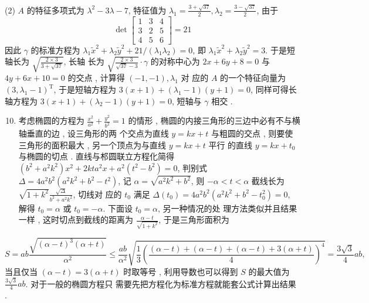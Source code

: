 \documentclass[10pt]{article}
\begin{document}
(2) $A$  的特征多项式为  $\lambda^{2}-3 \lambda-7$,  特征值为  $\lambda_{1}=\frac{3+\sqrt{37}}{2}, \lambda_{2}=\frac{3-\sqrt{37}}{2}$,  由于 
$$
\operatorname{det}\left[\begin{array}{ccc}
1 & 3 & 4 \\
3 & 2 & 5 \\
4 & 5 & 6
\end{array}\right]=21
$$
 因此  $\gamma$  的标准方程为  $\lambda_{1} \tilde{x}^{2}+\lambda_{2} \tilde{y}^{2}+21 /\left(\lambda_{1} \lambda_{2}\right)=0$,  即  $\lambda_{1} \tilde{x}^{2}+\lambda_{2} \tilde{y}^{2}=3$.  于是短轴长为  $\sqrt{\frac{2 \times 3}{3+\sqrt{37}}}$,  长轴   长为  $\sqrt{\frac{2 \times 3}{\sqrt{37}-3}} \cdot \gamma$  的对称中心为  $2 x+6 y+8=0$  与  $4 y+6 x+10=0$  的交点 ,  计算得  $(-1,-1), \lambda_{1}$  对   应的  $A$  的一个特征向量为  $\left(3, \lambda_{1}-1\right)^{\mathrm{T}}$,  于是短轴方程为  $3(x+1)+\left(\lambda_{1}-1\right)(y+1)=0$,  同样可得长   轴方程为  $3(x+1)+\left(\lambda_{2}-1\right)(y+1)=0$,  短轴与  $\gamma$  相交 .

\begin{enumerate}
  \setcounter{enumi}{9}
  \item  考虑椭圆的方程为  $\frac{x^{2}}{a^{2}}+\frac{y^{2}}{b^{2}}=1$  的情形 ,  椭圆的内接三角形的三边中必有不与横轴垂直的边 ,  设三角形的两   个交点为直线  $y=k x+t$  与粗圆的交点 ,  则要使三角形的面积最大 ,  另一个顶点为与直线  $y=k x+t$  平行   的直线  $y=k x+t_{0}$  与椭圆的切点 .  直线与䢶圆联立方程化简得  $\left(b^{2}+a^{2} k^{2}\right) x^{2}+2 k t a^{2} x+a^{2}\left(t^{2}-b^{2}\right)=0$,  判别式  $\Delta=4 a^{2} b^{2}\left(a^{2} k^{2}+b^{2}-t^{2}\right)$,  记  $\alpha=\sqrt{a^{2} k^{2}+b^{2}}$,  则  $-\alpha<t<\alpha$  截线长为  $\sqrt{1+k^{2}} \frac{\sqrt{\Delta}}{b^{2}+a^{2} k^{2}}$,  切线对   应的  $t_{0}$  满足  $\Delta\left(t_{0}\right)=4 a^{2} b^{2}\left(a^{2} k^{2}+b^{2}-t_{0}^{2}\right)=0$,  解得  $t_{0}=\alpha$  或  $t_{0}=-\alpha$.  下面设  $t_{0}=\alpha$,  另一种情况的处   理方法类似并且结果一样 ,  这时切点到截线的距离为  $\frac{\alpha-t}{\sqrt{1+k^{2}}}$,  于是三角形面积为 
\end{enumerate}
$$
S=a b \frac{\sqrt{(\alpha-t)^{3}(\alpha+t)}}{\alpha^{2}} \leqslant \frac{a b}{\alpha^{2}} \sqrt{\frac{1}{3}\left(\frac{(\alpha-t)+(\alpha-t)+(\alpha-t)+3(\alpha+t)}{4}\right)^{4}}=\frac{3 \sqrt{3}}{4} a b,
$$
 当且仅当  $(\alpha-t)=3(\alpha+t)$  时取等号 ,  利用导数也可以得到  $S$  的最大值为  $\frac{3 \sqrt{3}}{4} a b$.  对于一般的椭圆方程只   需要先把方程化为标准方程就能套公式计算出结果 .
\end{document}
